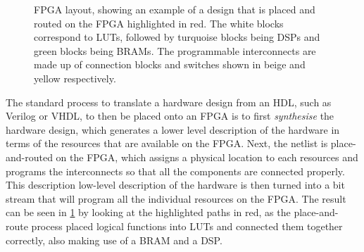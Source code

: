 \begin{figure}
  \caption[FPGA layout, showing an example of a design that is placed and routed
  on the FPGA highlighted in red.  The white blocks correspond to LUTs, followed
  by turquoise blocks being DSPs and green blocks being BRAMs.  The programmable
  interconnects are made up of connection blocks and switches shown in beige and
  yellow respectively.]{\Gls{FPGA} layout, showing an example of a design that
    is placed and routed on the \gls{FPGA} highlighted in red.  The white blocks
    correspond to \glspl{LUT}, followed by turquoise blocks being \glspl{DSP}
    and green blocks being \glspl{BRAM}.  The programmable interconnects are
    made up of connection blocks and switches shown in beige and yellow
    respectively.}%
  \label{fig:bg:fpga-layout}
\end{figure}

The standard process to translate a hardware design from an \gls{HDL}, such as
Verilog or VHDL, to then be placed onto an \gls{FPGA} is to first
\emph{synthesise} the hardware design, which generates a lower level description
of the hardware in terms of the resources that are available on the \gls{FPGA}.
Next, the netlist is place-and-routed on the \gls{FPGA}, which assigns a
physical location to each resources and programs the interconnects so that all
the components are connected properly.  This description low-level description
of the hardware is then turned into a bit stream that will program all the
individual resources on the \gls{FPGA}.  The result can be seen in
\cref{fig:bg:fpga-layout} by looking at the highlighted paths in red, as the
place-and-route process placed logical functions into \glspl{LUT} and connected
them together correctly, also making use of a \gls{BRAM} and a \gls{DSP}.

